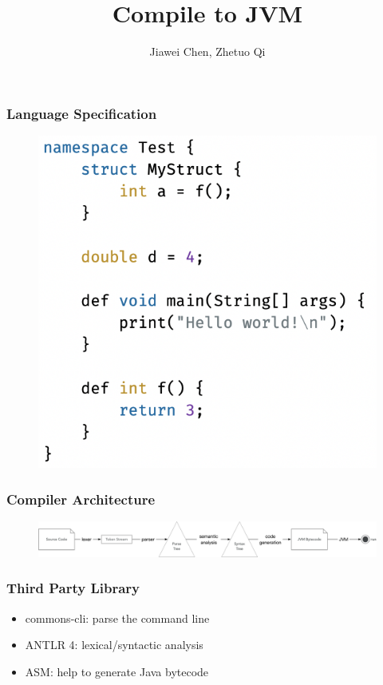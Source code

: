 \documentclass{beamer}
\begin{document}
\title{Compile to JVM}
\author{Jiawei Chen, Zhetuo Qi}
\begin{frame}
    \maketitle
\end{frame}

\begin{frame}
    \frametitle{Language Specification}
    \begin{figure}[h]
        \centering
        \includegraphics[scale=0.7]{assets/general.png}    
    \end{figure}
\end{frame}

\begin{frame}
    \frametitle{Compiler Architecture}
    \begin{figure}[h]
        \centering
        \includegraphics[scale=0.28]{assets/architecture.png}    
    \end{figure}
\end{frame}

\begin{frame}
    \frametitle{Third Party Library}
    \begin{itemize}
        \item commons-cli: parse the command line
        \item ANTLR 4: lexical/syntactic analysis
        \item ASM: help to generate Java bytecode
    \end{itemize}
\end{frame}
\end{document}

